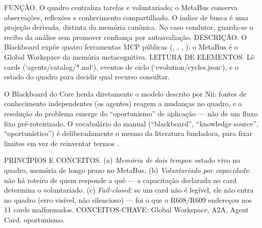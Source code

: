\begin{descricao}
FUNÇÃO. O quadro centraliza tarefas e voluntariado; o MetaBus conserva
observações, reflexões e conhecimento compartilhado. O índice de busca é
uma projeção derivada, distinta da memória canônica. No caso condutor,
guarda-se o recibo da análise sem promover confiança por autoavaliação.
DESCRIÇÃO. O Blackboard expõe quatro ferramentas MCP públicas
(, , ,
); o MetaBus é o Global Workspace da memória
metacognitiva. LEITURA DE ELEMENTOS. Lê cards (`agents/catalog/*.md`),
eventos de ciclo (`evolution/cycles.json`), e o estado do quadro para decidir
qual recurso consultar.
\end{descricao}

O Blackboard do Core herda diretamente o modelo descrito por Nii: fontes de
conhecimento independentes (os agentes) reagem a mudanças no quadro, e a
resolução do problema emerge do ``oportunismo'' de aplicação — não de um
fluxo fixo pré-roteirizado. O vocabulário do manual (``blackboard'',
``knowledge source'', ``oportunístico'') é deliberadamente o mesmo da
literatura fundadora, para fixar limites em vez de reinventar termos .\begin{conceito}
PRINCÍPIOS E CONCEITOS. (a) \emph{Memória de dois tempos}: estado vivo no
quadro, memória de longo prazo no MetaBus. (b) \emph{Voluntariado por
capacidade}: não há roteiro de quem responde a quê — a capacitação declarada
no card determina o voluntariado. (c) \emph{Fail-closed}: se um card não é
legível, ele não entra no quadro (erro visível, não silencioso) — foi o que o
R608/R609 endereçou nos 11 cards malformados. CONCEITOS-CHAVE: Global
Workspace, A2A, Agent Card, oportunismo.
\end{conceito}

